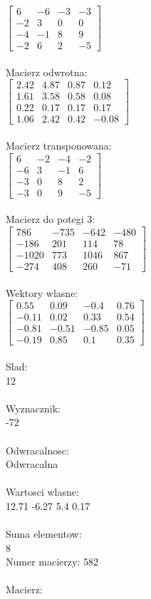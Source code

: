 \documentclass[a4paper,12pt]{article}
\begin{document}
$\begin{bmatrix} 6&-6&-3&-3\\-2&3&0&0\\-4&-1&8&9\\-2&6&2&-5 \end{bmatrix}$
\\
\\
Macierz odwrotna:\\

$\begin{bmatrix} 2.42&4.87&0.87&0.12\\1.61&3.58&0.58&0.08\\0.22&0.17&0.17&0.17\\1.06&2.42&0.42&-0.08 \end{bmatrix}$
\\
\\
Macierz transponowana:\\

$\begin{bmatrix} 6&-2&-4&-2\\-6&3&-1&6\\-3&0&8&2\\-3&0&9&-5 \end{bmatrix}$
\\
\\
Macierz do potegi 3:\\

$\begin{bmatrix} 786&-735&-642&-480\\-186&201&114&78\\-1020&773&1046&867\\-274&408&260&-71 \end{bmatrix}$
\\
\\
Wektory wlasne:\\

$\begin{bmatrix} 0.55&0.09&-0.4&0.76\\-0.11&0.02&0.33&0.54\\-0.81&-0.51&-0.85&0.05\\-0.19&0.85&0.1&0.35 \end{bmatrix}$
\\
\\
Slad:\\
12
\\
\\
Wyznacznik:\\
-72
\\
\\
Odwracalnosc:\\
Odwracalna
\\
\\
Wartosci wlasne:\\
12.71 -6.27 5.4 0.17
\\
\\
Suma elementow:\\
8
\\
\newpage
Numer macierzy:
582
\\
\\
Macierz:\\
\end{document}
